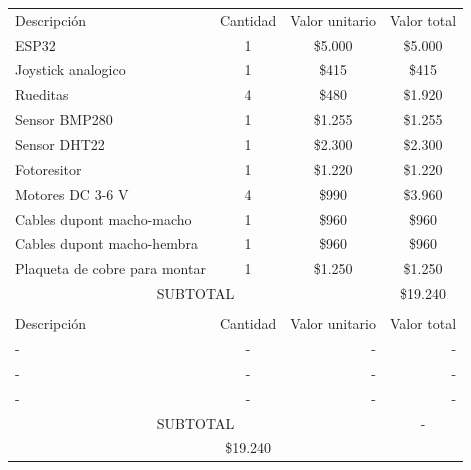 \documentclass[
11pt, %
codirector, %
]{charter}
\begin{document}
\begin{table}[htpb]
\centering
\begin{tabularx}{\linewidth}{@{}|X|c|r|r|@{}}
\hline
\rowcolor[HTML]{C0C0C0} 
\multicolumn{4}{|c|}{\cellcolor[HTML]{C0C0C0}COSTOS DIRECTOS} \\ \hline
\rowcolor[HTML]{C0C0C0} 
Descripción &
  \multicolumn{1}{c|}{\cellcolor[HTML]{C0C0C0}Cantidad} &
  \multicolumn{1}{c|}{\cellcolor[HTML]{C0C0C0}Valor unitario} &
  \multicolumn{1}{c|}{\cellcolor[HTML]{C0C0C0}Valor total} \\ \hline
 ESP32 & 
  \multicolumn{1}{c|}{1} &
  \multicolumn{1}{c|}{\$5.000} &
  \multicolumn{1}{c|}{\$5.000} \\ \hline
 Joystick analogico &
  \multicolumn{1}{c|}{1} &
  \multicolumn{1}{c|}{\$415} &
  \multicolumn{1}{c|}{\$415} \\ \hline
 Rueditas &
  \multicolumn{1}{c|}{4} &
  \multicolumn{1}{c|}{\$480} &
  \multicolumn{1}{c|}{\$1.920} \\ \hline
 Sensor BMP280 &
  \multicolumn{1}{c|}{1} &
  \multicolumn{1}{c|}{\$1.255} &
  \multicolumn{1}{c|}{\$1.255} \\ \hline
 Sensor DHT22 &
  \multicolumn{1}{c|}{1} &
  \multicolumn{1}{c|}{\$2.300} &
  \multicolumn{1}{c|}{\$2.300} \\ \hline
 Fotoresitor &
  \multicolumn{1}{c|}{1} &
  \multicolumn{1}{c|}{\$1.220} &
  \multicolumn{1}{c|}{\$1.220} \\ \hline
 Motores DC 3-6 V &
  \multicolumn{1}{c|}{4} &
  \multicolumn{1}{c|}{\$990} &
  \multicolumn{1}{c|}{\$3.960} \\ \hline
 Cables dupont macho-macho &
  \multicolumn{1}{c|}{1} &
  \multicolumn{1}{c|}{\$960} &
  \multicolumn{1}{c|}{\$960} \\ \hline
 Cables dupont macho-hembra &
  \multicolumn{1}{c|}{1} &
  \multicolumn{1}{c|}{\$960} &
  \multicolumn{1}{c|}{\$960} \\ \hline
 Plaqueta de cobre para montar &
  \multicolumn{1}{c|}{1} &
  \multicolumn{1}{c|}{\$1.250} &
  \multicolumn{1}{c|}{\$1.250} \\ \hline

\multicolumn{3}{|c|}{SUBTOTAL} &
  \multicolumn{1}{c|}{\$19.240} \\ \hline
\rowcolor[HTML]{C0C0C0} 
\multicolumn{4}{|c|}{\cellcolor[HTML]{C0C0C0}COSTOS INDIRECTOS} \\ \hline
\rowcolor[HTML]{C0C0C0} 
Descripción &
  \multicolumn{1}{c|}{\cellcolor[HTML]{C0C0C0}Cantidad} &
  \multicolumn{1}{c|}{\cellcolor[HTML]{C0C0C0}Valor unitario} &
  \multicolumn{1}{c|}{\cellcolor[HTML]{C0C0C0}Valor total} \\ \hline
\multicolumn{1}{|l|}{-} &
  - &
  - &
  -\\ \hline
\multicolumn{1}{|l|}{-} &
  - &
  - &
  - \\ \hline
\multicolumn{1}{|l|}{-} &
  - &
  - &
  - \\ \hline
\multicolumn{3}{|c|}{SUBTOTAL} &
  \multicolumn{1}{c|}{-} \\ \hline
\rowcolor[HTML]{C0C0C0}
\multicolumn{3}{|c|}{TOTAL} & \$19.240
   \\ \hline
\end{tabularx}%
\end{table}
\end{document}
